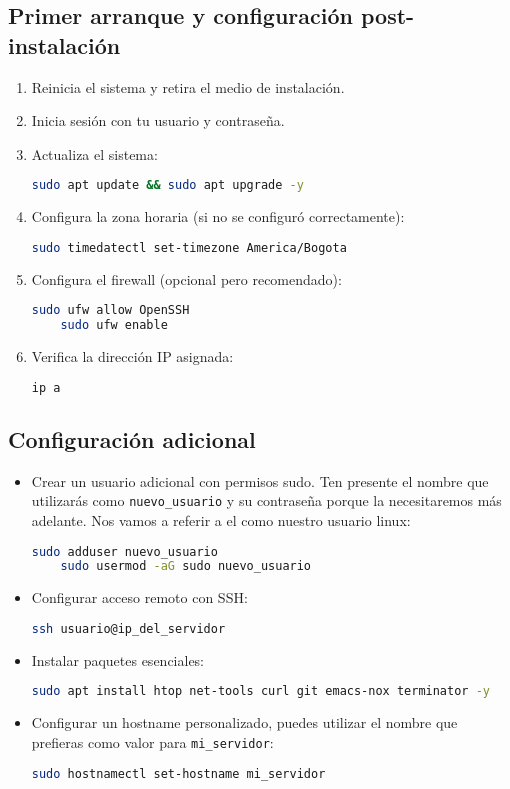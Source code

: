 \documentclass{article}
\begin{document}
\subsection{Primer arranque y configuración post-instalación}
\begin{enumerate}
    \item Reinicia el sistema y retira el medio de instalación.
    \item Inicia sesión con tu usuario y contraseña.
    \item Actualiza el sistema:
    \begin{lstlisting}[language=bash]
    sudo apt update && sudo apt upgrade -y
    \end{lstlisting}
    \item Configura la zona horaria (si no se configuró correctamente):
    \begin{lstlisting}[language=bash]
    sudo timedatectl set-timezone America/Bogota
    \end{lstlisting}
    \item Configura el firewall (opcional pero recomendado):
    \begin{lstlisting}[language=bash]
    sudo ufw allow OpenSSH
    sudo ufw enable
    \end{lstlisting}
    \item Verifica la dirección IP asignada:
    \begin{lstlisting}[language=bash]
    ip a
    \end{lstlisting}
\end{enumerate}

\subsection{Configuración adicional}\label{sec:user}
\begin{itemize}
    \item Crear un usuario adicional con permisos sudo. Ten presente el nombre que utilizarás como \texttt{nuevo\_usuario} y su contraseña porque la necesitaremos más adelante.  Nos vamos a referir a el como nuestro usuario linux:
    \begin{lstlisting}[language=bash]
    sudo adduser nuevo_usuario
    sudo usermod -aG sudo nuevo_usuario
    \end{lstlisting}
    \item Configurar acceso remoto con SSH:
    \begin{lstlisting}[language=bash]
    ssh usuario@ip_del_servidor
    \end{lstlisting}
    \item Instalar paquetes esenciales:
    \begin{lstlisting}[language=bash]
    sudo apt install htop net-tools curl git emacs-nox terminator -y
    \end{lstlisting}
    \item Configurar un hostname personalizado, puedes utilizar el nombre que prefieras como valor para \texttt{mi\_servidor}:
    \begin{lstlisting}[language=bash]
    sudo hostnamectl set-hostname mi_servidor
    \end{lstlisting}
\end{itemize}
\end{document}
